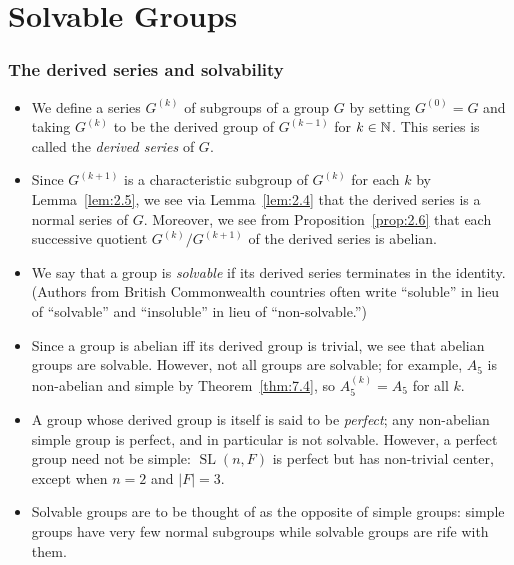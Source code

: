 \documentclass[../Odyssey_Project.tex]{subfiles}
\begin{document}
\setcounter{section}{10}
\section{Solvable Groups}

\subsubsection*{The derived series and solvability}
\begin{itemize}
    \item We define a series $G^{(k)}$ of subgroups of a group $G$ by setting $G^{(0)} = G$ and taking $G^{(k)}$ to be the derived group of $G^{(k-1)}$ for $k \in \mathbb{N}$. This series is called the \emph{derived series} of $G$.
    \item Since $G^{(k+1)}$ is a characteristic subgroup of $G^{(k)}$ for each $k$ by Lemma~\ref{lem:2.5}, we see via Lemma~\ref{lem:2.4} that the derived series is a normal series of $G$. Moreover, we see from Proposition~\ref{prop:2.6} that each successive quotient $G^{(k)}/G^{(k+1)}$ of the derived series is abelian.
    \item We say that a group is \emph{solvable} if its derived series terminates in the identity. (Authors from British Commonwealth countries often write ``soluble'' in lieu of ``solvable'' and ``insoluble'' in lieu of ``non-solvable.'')
    \item Since a group is abelian iff its derived group is trivial, we see that abelian groups are solvable. However, not all groups are solvable; for example, $A_5$ is non-abelian and simple by Theorem~\ref{thm:7.4}, so $A_5^{(k)} = A_5$ for all $k$.
    \item A group whose derived group is itself is said to be \emph{perfect}; any non-abelian simple group is perfect, and in particular is not solvable. However, a perfect group need not be simple: $\operatorname{SL}(n, F)$ is perfect but has non-trivial center, except when $n = 2$ and $|F| = 3$.
    \item Solvable groups are to be thought of as the opposite of simple groups: simple groups have very few normal subgroups while solvable groups are rife with them.
\end{itemize}
\end{document}
